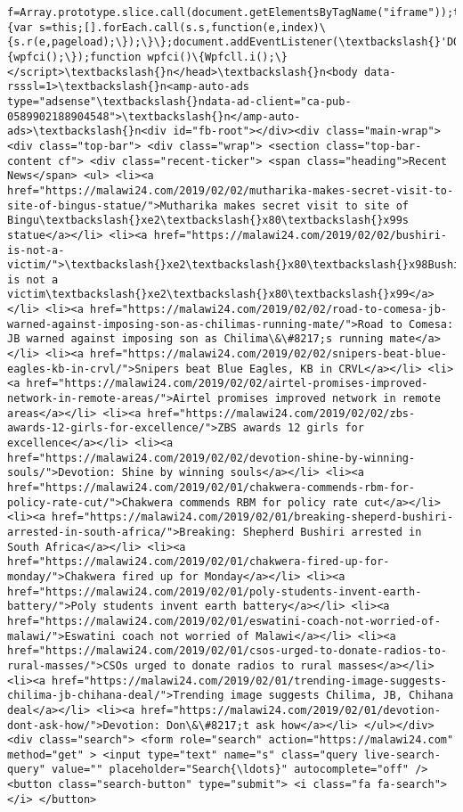 \documentclass[11pt]{article}
\begin{document}
\begin{Verbatim}[commandchars=\\\{\}]
f=Array.prototype.slice.call(document.getElementsByTagName("iframe"));this.s=i.concat(f);\},ls:function(pageload)\{var s=this;[].forEach.call(s.s,function(e,index)\{s.r(e,pageload);\});\}\};document.addEventListener(\textbackslash{}'DOMContentLoaded\textbackslash{}',function()\{wpfci();\});function wpfci()\{Wpfcll.i();\}</script>\textbackslash{}n</head>\textbackslash{}n<body data-rsssl=1>\textbackslash{}n<amp-auto-ads type="adsense"\textbackslash{}ndata-ad-client="ca-pub-0589902188904548">\textbackslash{}n</amp-auto-ads>\textbackslash{}n<div id="fb-root"></div><div class="main-wrap"> <div class="top-bar"> <div class="wrap"> <section class="top-bar-content cf"> <div class="recent-ticker"> <span class="heading">Recent News</span> <ul> <li><a href="https://malawi24.com/2019/02/02/mutharika-makes-secret-visit-to-site-of-bingus-statue/">Mutharika makes secret visit to site of Bingu\textbackslash{}xe2\textbackslash{}x80\textbackslash{}x99s statue</a></li> <li><a href="https://malawi24.com/2019/02/02/bushiri-is-not-a-victim/">\textbackslash{}xe2\textbackslash{}x80\textbackslash{}x98Bushiri is not a victim\textbackslash{}xe2\textbackslash{}x80\textbackslash{}x99</a></li> <li><a href="https://malawi24.com/2019/02/02/road-to-comesa-jb-warned-against-imposing-son-as-chilimas-running-mate/">Road to Comesa: JB warned against imposing son as Chilima\&\#8217;s running mate</a></li> <li><a href="https://malawi24.com/2019/02/02/snipers-beat-blue-eagles-kb-in-crvl/">Snipers beat Blue Eagles, KB in CRVL</a></li> <li><a href="https://malawi24.com/2019/02/02/airtel-promises-improved-network-in-remote-areas/">Airtel promises improved network in remote areas</a></li> <li><a href="https://malawi24.com/2019/02/02/zbs-awards-12-girls-for-excellence/">ZBS awards 12 girls for excellence</a></li> <li><a href="https://malawi24.com/2019/02/02/devotion-shine-by-winning-souls/">Devotion: Shine by winning souls</a></li> <li><a href="https://malawi24.com/2019/02/01/chakwera-commends-rbm-for-policy-rate-cut/">Chakwera commends RBM for policy rate cut</a></li> <li><a href="https://malawi24.com/2019/02/01/breaking-sheperd-bushiri-arrested-in-south-africa/">Breaking: Shepherd Bushiri arrested in South Africa</a></li> <li><a href="https://malawi24.com/2019/02/01/chakwera-fired-up-for-monday/">Chakwera fired up for Monday</a></li> <li><a href="https://malawi24.com/2019/02/01/poly-students-invent-earth-battery/">Poly students invent earth battery</a></li> <li><a href="https://malawi24.com/2019/02/01/eswatini-coach-not-worried-of-malawi/">Eswatini coach not worried of Malawi</a></li> <li><a href="https://malawi24.com/2019/02/01/csos-urged-to-donate-radios-to-rural-masses/">CSOs urged to donate radios to rural masses</a></li> <li><a href="https://malawi24.com/2019/02/01/trending-image-suggests-chilima-jb-chihana-deal/">Trending image suggests Chilima, JB, Chihana deal</a></li> <li><a href="https://malawi24.com/2019/02/01/devotion-dont-ask-how/">Devotion: Don\&\#8217;t ask how</a></li> </ul></div><div class="search"> <form role="search" action="https://malawi24.com" method="get" > <input type="text" name="s" class="query live-search-query" value="" placeholder="Search{\ldots}" autocomplete="off" /> <button class="search-button" type="submit"> <i class="fa fa-search"></i> </button> 
\end{Verbatim}
\end{document}
